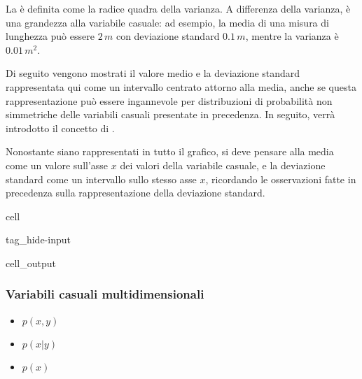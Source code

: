 \documentclass[letterpaper,10pt,italian]{jupyterBook}
\begin{document}
\sphinxAtStartPar
La  è definita come la radice quadra della varianza. A differenza della varianza, è una grandezza  \sphinxstylestrong{(!)} alla variabile casuale: ad esempio, la media di una misura di lunghezza può essere \(2 \, m\) con deviazione standard \(0.1 \, m\), mentre la varianza è \(0.01 \, m^2\).

\sphinxAtStartPar
Di seguito vengono mostrati il valore medio e la deviazione standard \sphinxhyphen{} rappresentata qui come un intervallo centrato attorno alla media, anche se questa rappresentazione può essere ingannevole \sphinxstylestrong{(!)} per distribuzioni di probabilità non simmetriche \sphinxhyphen{} delle variabili casuali presentate in precedenza. In seguito, verrà introdotto il concetto di .  

\sphinxAtStartPar
{} Nonostante siano rappresentati in tutto il grafico, si deve pensare alla media come un valore sull’asse \(x\) dei valori della variabile casuale, e la deviazione standard come un intervallo sullo stesso asse \(x\), ricordando le osservazioni fatte in precedenza sulla rappresentazione della deviazione standard.

\begin{sphinxuseclass}{cell}
\begin{sphinxuseclass}{tag_hide-input}\begin{sphinxVerbatimOutput}

\begin{sphinxuseclass}{cell_output}
\noindent{}

\end{sphinxuseclass}\end{sphinxVerbatimOutput}

\end{sphinxuseclass}
\end{sphinxuseclass}



\subsubsection{Variabili casuali multi\sphinxhyphen{}dimensionali}
\label{\detokenize{ch/statistics/random_variables_discrete:variabili-casuali-multi-dimensionali}}\begin{itemize}
\item {} 
\sphinxAtStartPar
{} \(p(x,y)\)

\item {} 
\sphinxAtStartPar
{} \(p(x|y)\)

\item {} 
\sphinxAtStartPar
{} \(p(x)\)

\end{itemize}
\end{document}
